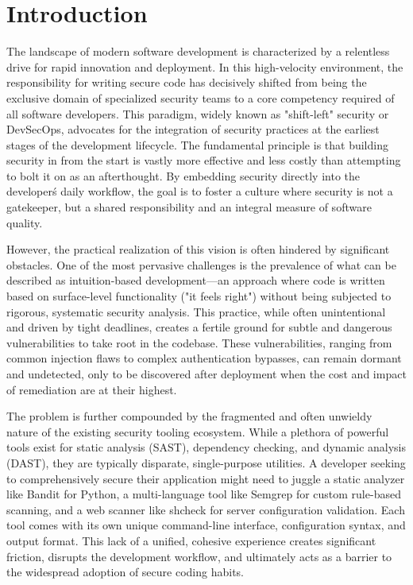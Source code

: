 \chapter{Introduction}
\label{chap:intro}
\setlength{\parskip}{1em}

The landscape of modern software development is characterized by a relentless drive for rapid innovation and deployment. In this high-velocity environment, the responsibility for writing secure code has decisively shifted from being the exclusive domain of specialized security teams to a core competency required of all software developers. This paradigm, widely known as "shift-left" security or DevSecOps, advocates for the integration of security practices at the earliest stages of the development lifecycle. The fundamental principle is that building security in from the start is vastly more effective and less costly than attempting to bolt it on as an afterthought. By embedding security directly into the developer\'s daily workflow, the goal is to foster a culture where security is not a gatekeeper, but a shared responsibility and an integral measure of software quality.

However, the practical realization of this vision is often hindered by significant obstacles. One of the most pervasive challenges is the prevalence of what can be described as intuition-based development—an approach where code is written based on surface-level functionality ("it feels right") without being subjected to rigorous, systematic security analysis. This practice, while often unintentional and driven by tight deadlines, creates a fertile ground for subtle and dangerous vulnerabilities to take root in the codebase. These vulnerabilities, ranging from common injection flaws to complex authentication bypasses, can remain dormant and undetected, only to be discovered after deployment when the cost and impact of remediation are at their highest.

The problem is further compounded by the fragmented and often unwieldy nature of the existing security tooling ecosystem. While a plethora of powerful tools exist for static analysis (SAST), dependency checking, and dynamic analysis (DAST), they are typically disparate, single-purpose utilities. A developer seeking to comprehensively secure their application might need to juggle a static analyzer like Bandit for Python, a multi-language tool like Semgrep for custom rule-based scanning, and a web scanner like shcheck for server configuration validation. Each tool comes with its own unique command-line interface, configuration syntax, and output format. This lack of a unified, cohesive experience creates significant friction, disrupts the development workflow, and ultimately acts as a barrier to the widespread adoption of secure coding habits.

